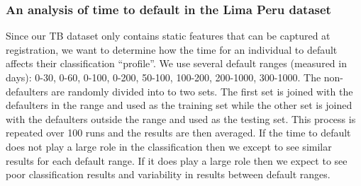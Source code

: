\documentclass{sig-alternate-05-2015}
\begin{document}
	\subsubsection{An analysis of time to default in the Lima Peru dataset}
	Since our TB dataset only contains static features that can be captured at registration, we want to determine how the time for an individual to default affects their classification ``profile''. We use several default ranges (measured in days): 0-30, 0-60, 0-100, 0-200, 50-100, 100-200, 200-1000, 300-1000. The non-defaulters are randomly divided into to two sets. The first set is joined with the defaulters in the range and used as the training set while the other set is joined with the defaulters outside the range and used as the testing set. This process is repeated over 100 runs and the results are then averaged. If the time to default does not play a large role in the classification then we except to see similar results for each default range. If it does play a large role then we expect to see poor classification results and variability in results between default ranges.
	
\end{document}
